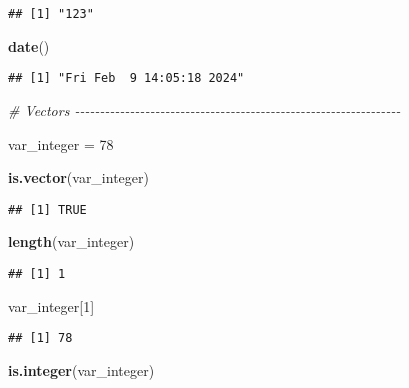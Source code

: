 \documentclass[
]{article}
\newenvironment{Shaded}{\begin{snugshade}}{\end{snugshade}}
\newcommand{\CommentTok}[1]{\textcolor[rgb]{0.56,0.35,0.01}{\textit{#1}}}
\newcommand{\DecValTok}[1]{\textcolor[rgb]{0.00,0.00,0.81}{#1}}
\newcommand{\FunctionTok}[1]{\textcolor[rgb]{0.13,0.29,0.53}{\textbf{#1}}}
\newcommand{\NormalTok}[1]{#1}
\newcommand{\OtherTok}[1]{\textcolor[rgb]{0.56,0.35,0.01}{#1}}
\begin{document}
\begin{verbatim}
## [1] "123"
\end{verbatim}

\begin{Shaded}
\begin{Highlighting}[]
\FunctionTok{date}\NormalTok{()}
\end{Highlighting}
\end{Shaded}

\begin{verbatim}
## [1] "Fri Feb  9 14:05:18 2024"
\end{verbatim}

\begin{Shaded}
\begin{Highlighting}[]
\CommentTok{\# Vectors {-}{-}{-}{-}{-}{-}{-}{-}{-}{-}{-}{-}{-}{-}{-}{-}{-}{-}{-}{-}{-}{-}{-}{-}{-}{-}{-}{-}{-}{-}{-}{-}{-}{-}{-}{-}{-}{-}{-}{-}{-}{-}{-}{-}{-}{-}{-}{-}{-}{-}{-}{-}{-}{-}{-}{-}{-}{-}{-}{-}{-}{-}{-}{-}{-}}

\NormalTok{var\_integer }\OtherTok{=} \DecValTok{78}

\FunctionTok{is.vector}\NormalTok{(var\_integer)}
\end{Highlighting}
\end{Shaded}

\begin{verbatim}
## [1] TRUE
\end{verbatim}

\begin{Shaded}
\begin{Highlighting}[]
\FunctionTok{length}\NormalTok{(var\_integer)}
\end{Highlighting}
\end{Shaded}

\begin{verbatim}
## [1] 1
\end{verbatim}

\begin{Shaded}
\begin{Highlighting}[]
\NormalTok{var\_integer[}\DecValTok{1}\NormalTok{]}
\end{Highlighting}
\end{Shaded}

\begin{verbatim}
## [1] 78
\end{verbatim}

\begin{Shaded}
\begin{Highlighting}[]
\FunctionTok{is.integer}\NormalTok{(var\_integer)}
\end{Highlighting}
\end{Shaded}
\end{document}
